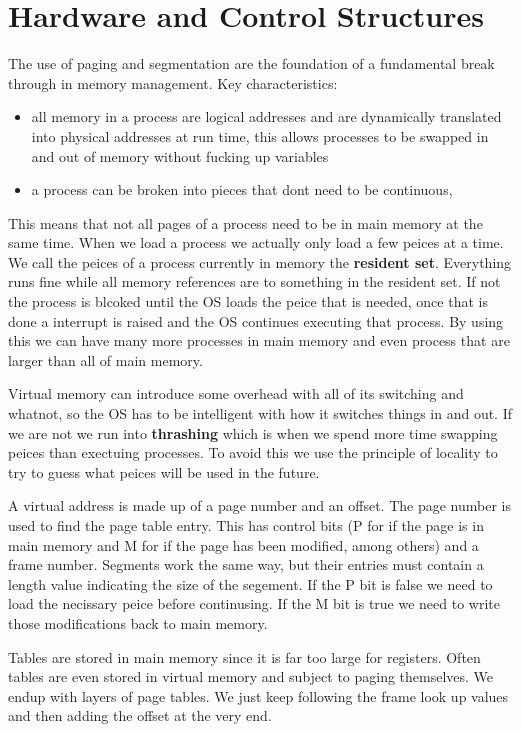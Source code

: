 \documentclass[12pt]{article}
\begin{document}

\section{Hardware and Control Structures}
The use of paging and segmentation are the foundation of a fundamental break through in memory management. Key characteristics:
\begin{itemize}
  \item all memory in a process are logical addresses and are dynamically translated into physical addresses at run time, this allows processes to be swapped in and out of memory without fucking up variables
  \item a process can be broken into pieces that dont need to be continuous,
\end{itemize}
This means that not all pages of a process need to be in main memory at the same time. When we load a process we actually only load a few peices at a time. We call the peices of a process currently in memory the \textbf{resident set}. Everything runs fine while all memory references are to something in the resident set. If not the process is blcoked until the OS loads the peice that is needed, once that is done a interrupt is raised and the OS continues executing that process. By using this we can have many more processes in main memory and even process that are larger than all of main memory.

Virtual memory can introduce some overhead with all of its switching and whatnot, so the OS has to be intelligent with how it switches things in and out. If we are not we run into \textbf{thrashing} which is when we spend more time swapping peices than exectuing processes. To avoid this we use the principle of locality to try to guess what peices will be used in the future.

A virtual address is made up of a page number and an offset. The page number is used to find the page table entry. This has control bits (P for if the page is in main memory and M for if the page has been modified, among others) and a frame number. Segments work the same way, but their entries must contain a length value indicating the size of the segement. If the P bit is false we need to load the necissary peice before continusing. If the M bit is true we need to write those modifications back to main memory.

Tables are stored in main memory since it is far too large for registers. Often tables are even stored in virtual memory and subject to paging themselves. We endup with layers of page tables. We just keep following the frame look up values and then adding the offset at the very end.
\end{document}

